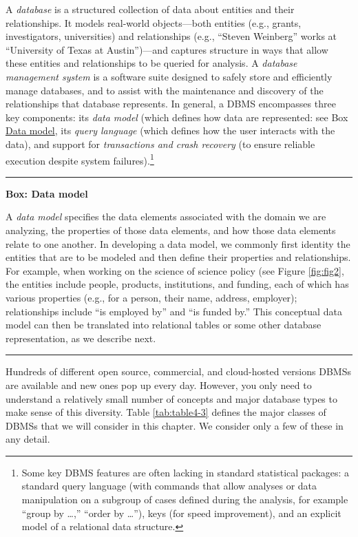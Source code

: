 \documentclass[]{krantz}
\begin{document}
A \emph{database} is a structured collection of data about entities and
their relationships. It models real-world objects---both entities (e.g.,
grants, investigators, universities) and relationships (e.g., ``Steven
Weinberg'' works at ``University of Texas at Austin'')---and captures
structure in ways that allow these entities and relationships to be
queried for analysis. A \emph{database management system} is a software
suite designed to safely store and efficiently manage databases, and to
assist with the maintenance and discovery of the relationships that
database represents. In general, a DBMS encompasses three key
components: its \emph{data model} (which defines how data are
represented: see Box \protect\hyperlink{box:db1}{Data model}, its
\emph{query language} (which defines how the user interacts with the
data), and support for \emph{transactions and crash recovery} (to ensure
reliable execution despite system failures).\footnote{Some key DBMS
  features are often lacking in standard statistical packages: a
  standard query language (with commands that allow analyses or data
  manipulation on a subgroup of cases defined during the analysis, for
  example ``group by \ldots{},'' ``order by \ldots{}''), keys (for speed
  improvement), and an explicit model of a relational data structure.}

\begin{center}\rule{0.5\linewidth}{\linethickness}\end{center}

\textbf{Box: Data model}

A \emph{data model} specifies the data elements associated with the
domain we are analyzing, the properties of those data elements, and how
those data elements relate to one another. In developing a data model,
we commonly first identity the entities that are to be modeled and then
define their properties and relationships. For example, when working on
the science of science policy (see Figure \ref{fig:fig2}, the entities
include people, products, institutions, and funding, each of which has
various properties (e.g., for a person, their name, address, employer);
relationships include ``is employed by'' and ``is funded by.'' This
conceptual data model can then be translated into relational tables or
some other database representation, as we describe next.

\begin{center}\rule{0.5\linewidth}{\linethickness}\end{center}

Hundreds of different open source, commercial, and cloud-hosted versions
DBMSs are available and new ones pop up every day. However, you only
need to understand a relatively small number of concepts and major
database types to make sense of this diversity. Table \ref{tab:table4-3}
defines the major classes of DBMSs that we will consider in this
chapter. We consider only a few of these in any detail.
\end{document}
